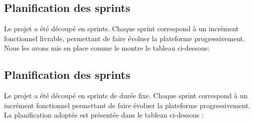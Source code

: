 \subsection{Planification des sprints}
Le projet a été découpé en sprints. Chaque sprint correspond à un incrément fonctionnel livrable, permettant de faire évoluer la plateforme progressivement. Nous les avons mis en place comme le montre le tableau ci-dessous:




\subsection{Planification des sprints}
Le projet a été découpé en sprints de durée fixe. Chaque sprint correspond à un incrément fonctionnel permettant de faire évoluer la plateforme progressivement. La planification adoptée est présentée dans le tableau ci-dessous :

